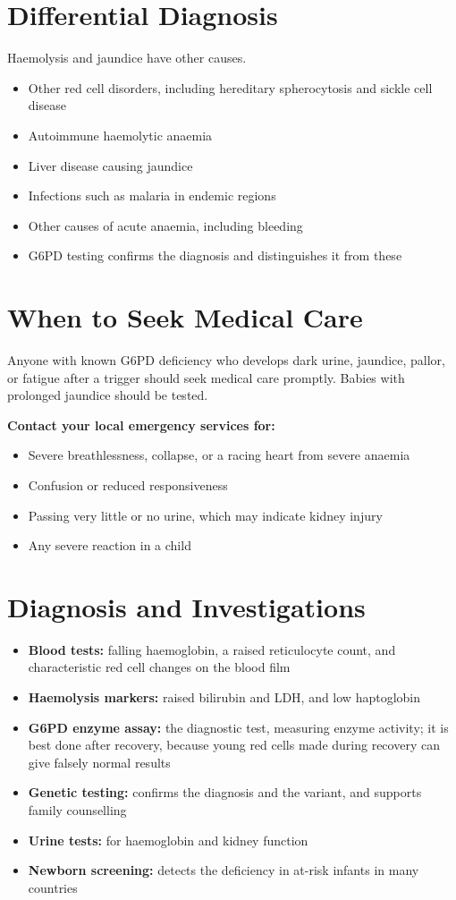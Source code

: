 \section*{Differential Diagnosis}
Haemolysis and jaundice have other causes.
\begin{itemize}
    \item Other red cell disorders, including hereditary spherocytosis and sickle cell disease
    \item Autoimmune haemolytic anaemia
    \item Liver disease causing jaundice
    \item Infections such as malaria in endemic regions
    \item Other causes of acute anaemia, including bleeding
    \item G6PD testing confirms the diagnosis and distinguishes it from these
\end{itemize}

\section*{When to Seek Medical Care}
Anyone with known G6PD deficiency who develops dark urine, jaundice, pallor, or fatigue after a trigger should seek medical care promptly. Babies with prolonged jaundice should be tested.

\textbf{Contact your local emergency services for:}
\begin{itemize}
    \item Severe breathlessness, collapse, or a racing heart from severe anaemia
    \item Confusion or reduced responsiveness
    \item Passing very little or no urine, which may indicate kidney injury
    \item Any severe reaction in a child
\end{itemize}

\section*{Diagnosis and Investigations}
\begin{itemize}
    \item \textbf{Blood tests:} falling haemoglobin, a raised reticulocyte count, and characteristic red cell changes on the blood film
    \item \textbf{Haemolysis markers:} raised bilirubin and LDH, and low haptoglobin
    \item \textbf{G6PD enzyme assay:} the diagnostic test, measuring enzyme activity; it is best done after recovery, because young red cells made during recovery can give falsely normal results
    \item \textbf{Genetic testing:} confirms the diagnosis and the variant, and supports family counselling
    \item \textbf{Urine tests:} for haemoglobin and kidney function
    \item \textbf{Newborn screening:} detects the deficiency in at-risk infants in many countries
\end{itemize}

